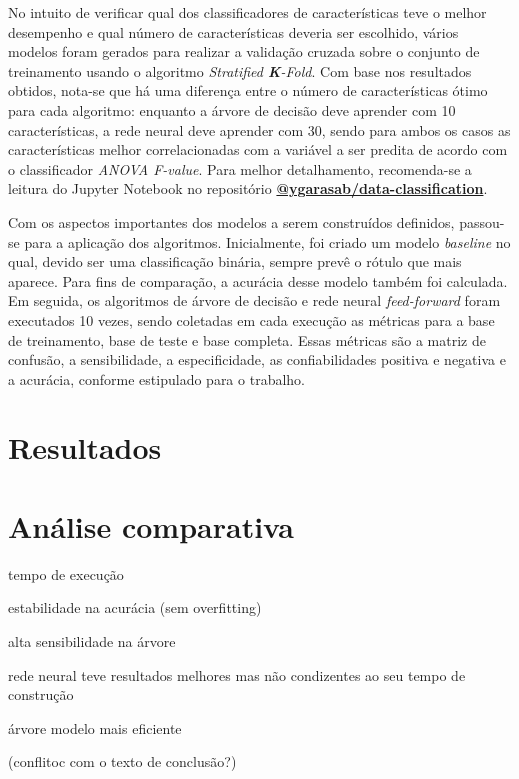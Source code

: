 \documentclass[12pt]{article}
\begin{document}
No intuito de verificar qual dos classificadores de características teve o melhor desempenho e qual número de características deveria ser escolhido, vários modelos foram gerados para realizar a validação cruzada sobre o conjunto de treinamento usando o algoritmo \textit{Stratified \textbf{K}-Fold}. Com base nos resultados obtidos, nota-se que há uma diferença entre o número de características ótimo para cada algoritmo: enquanto a árvore de decisão deve aprender com 10 características, a rede neural deve aprender com 30, sendo para ambos os casos as características melhor correlacionadas com a variável a ser predita de acordo com o classificador \textit{ANOVA F-value}. Para melhor detalhamento, recomenda-se a leitura do Jupyter Notebook no repositório \textbf{\href{https://github.com/ygarasab/data-classification}{@ygarasab/data-classification}}.

Com os aspectos importantes dos modelos a serem construídos definidos, passou-se para a aplicação dos algoritmos. Inicialmente, foi criado um modelo \textit{baseline} no qual, devido ser uma classificação binária, sempre prevê o rótulo que mais aparece. Para fins de comparação, a acurácia desse modelo também foi calculada. Em seguida, os algoritmos de árvore de decisão e rede neural \textit{feed-forward} foram executados 10 vezes, sendo coletadas em cada execução as métricas para a base de treinamento, base de teste e base completa. Essas métricas são a matriz de confusão, a sensibilidade, a especificidade, as confiabilidades positiva e negativa e a acurácia, conforme estipulado para o trabalho. 
	
\section{Resultados}\label{sec:resultados}

\section{Análise comparativa}\label{sec:analise}

tempo de execução

estabilidade na acurácia (sem overfitting)

alta sensibilidade na árvore

rede neural teve resultados melhores mas não condizentes ao seu tempo de construção

árvore modelo mais eficiente

(conflitoc com o texto de conclusão?)
\end{document}
